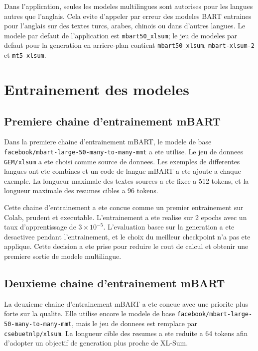 Dans l'application, seules les modeles multilingues sont autorises pour les langues autres que l'anglais. Cela evite d'appeler par erreur des modeles BART entraines pour l'anglais sur des textes turcs, arabes, chinois ou dans d'autres langues. Le modele par defaut de l'application est \texttt{mbart50\_xlsum}; le jeu de modeles par defaut pour la generation en arriere-plan contient \texttt{mbart50\_xlsum}, \texttt{mbart-xlsum-2} et \texttt{mt5-xlsum}.

\section{Entrainement des modeles}

\subsection{Premiere chaine d'entrainement mBART}

Dans la premiere chaine d'entrainement mBART, le modele de base \texttt{facebook/mbart-large-50-many-to-many-mmt} a ete utilise. Le jeu de donnees \texttt{GEM/xlsum} a ete choisi comme source de donnees. Les exemples de differentes langues ont ete combines et un code de langue mBART a ete ajoute a chaque exemple. La longueur maximale des textes sources a ete fixee a 512 tokens, et la longueur maximale des resumes cibles a 96 tokens.

Cette chaine d'entrainement a ete concue comme un premier entrainement sur Colab, prudent et executable. L'entrainement a ete realise sur 2 epochs avec un taux d'apprentissage de $3 \times 10^{-5}$. L'evaluation basee sur la generation a ete desactivee pendant l'entrainement, et le choix du meilleur checkpoint n'a pas ete applique. Cette decision a ete prise pour reduire le cout de calcul et obtenir une premiere sortie de modele multilingue.

\subsection{Deuxieme chaine d'entrainement mBART}

La deuxieme chaine d'entrainement mBART a ete concue avec une priorite plus forte sur la qualite. Elle utilise encore le modele de base \texttt{facebook/mbart-large-50-many-to-many-mmt}, mais le jeu de donnees est remplace par \texttt{csebuetnlp/xlsum}. La longueur cible des resumes a ete reduite a 64 tokens afin d'adopter un objectif de generation plus proche de XL-Sum.

